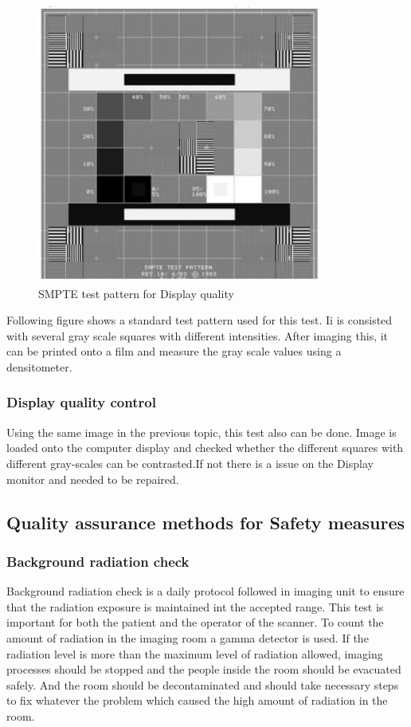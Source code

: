 \documentclass[12pt]{article}
\begin{document}
\begin{figure}[h!]
    \centering
    \includegraphics[width=0.65\linewidth]{d.jpg}
    \caption{\small{SMPTE test pattern for Display quality}}
    \label{fig:SMPTE test pattern for Display quality}
\end{figure}

Following figure shows a standard test pattern used for this test. Ii is consisted with several gray scale squares with different intensities. After imaging this, it can be printed onto a film and measure the gray scale values using a densitometer.  

\subsubsection{Display quality control}
Using the same image in the previous topic, this test also can be done. Image is loaded onto the computer display and checked whether the different squares with different gray-scales can be contrasted.If not there is a issue on the Display monitor and needed to be repaired. 

\subsection{Quality assurance methods for Safety measures}
\subsubsection{Background radiation check}
Background radiation check is a daily protocol followed in imaging unit to ensure that the radiation exposure is maintained int the accepted range. This test is important for both the patient and the operator of the scanner. To count the amount of radiation in the imaging room a gamma detector is used. If the radiation level is more than the maximum level of radiation allowed, imaging processes should be stopped and the people inside the room should be evacuated safely. And the room should be decontaminated and should take necessary steps to fix whatever the problem which caused the high amount of radiation in the room.
\end{document}
